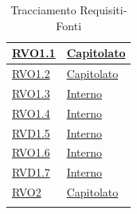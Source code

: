 \begin{longtable}{|>{\centering}m{5cm}|m{5cm}<{\centering}|}
\hyperlink{RVO1.1}{RVO1.1} & \hyperlink{Capitolato}{Capitolato}\\ \hline

\hyperlink{RVO1.2}{RVO1.2} & \hyperlink{Capitolato}{Capitolato}\\ \hline

\hyperlink{RVO1.3}{RVO1.3} & \hyperlink{Interno}{Interno}\\ \hline

\hyperlink{RVO1.4}{RVO1.4} & \hyperlink{Interno}{Interno}\\ \hline

\hyperlink{RVD1.5}{RVD1.5} & \hyperlink{Interno}{Interno}\\ \hline

\hyperlink{RVO1.6}{RVO1.6} & \hyperlink{Interno}{Interno}\\ \hline

\hyperlink{RVD1.7}{RVD1.7} & \hyperlink{Interno}{Interno}\\ \hline

\hyperlink{RVO2}{RVO2} & \hyperlink{Capitolato}{Capitolato}\\ \hline

\caption[Tracciamento Requisiti-Fonti]{Tracciamento Requisiti-Fonti}
\label{tabella:requi-fonti}
\end{longtable}

\clearpage

